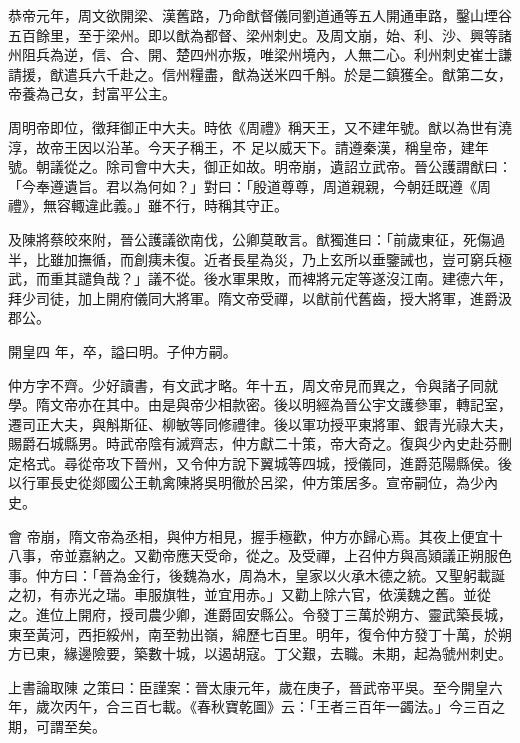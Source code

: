 \begin{pinyinscope}
 恭帝元年，周文欲開梁、漢舊路，乃命猷督儀同劉道通等五人開通車路，鑿山堙谷五百餘里，至于梁州。即以猷為都督、梁州刺史。及周文崩，始、利、沙、興等諸州阻兵為逆，信、合、開、楚四州亦叛，唯梁州境內，人無二心。利州刺史崔士謙請援，猷遣兵六千赴之。信州糧盡，猷為送米四千斛。於是二鎮獲全。猷第二女，帝養為己女，封富平公主。



 周明帝即位，徵拜御正中大夫。時依《周禮》稱天王，又不建年號。猷以為世有澆淳，故帝王因以沿革。今天子稱王，不
 足以威天下。請遵秦漢，稱皇帝，建年號。朝議從之。除司會中大夫，御正如故。明帝崩，遺詔立武帝。晉公護謂猷曰：「今奉遵遺旨。君以為何如？」對曰：「殷道尊尊，周道親親，今朝廷既遵《周禮》，無容輙違此義。」雖不行，時稱其守正。



 及陳將蔡皎來附，晉公護議欲南伐，公卿莫敢言。猷獨進曰：「前歲東征，死傷過半，比雖加撫循，而創痍未復。近者長星為災，乃上玄所以垂鑒誡也，豈可窮兵極武，而重其譴負哉？」議不從。後水軍果敗，而裨將元定等遂沒江南。建德六年，拜少司徒，加上開府儀同大將軍。隋文帝受禪，以猷前代舊齒，授大將軍，進爵汲郡公。



 開皇四
 年，卒，謚曰明。子仲方嗣。



 仲方字不齊。少好讀書，有文武才略。年十五，周文帝見而異之，令與諸子同就學。隋文帝亦在其中。由是與帝少相款密。後以明經為晉公宇文護參軍，轉記室，遷司正大夫，與斛斯征、柳敏等同修禮律。後以軍功授平東將軍、銀青光祿大夫，賜爵石城縣男。時武帝陰有滅齊志，仲方獻二十策，帝大奇之。復與少內史赴芬刪定格式。尋從帝攻下晉州，又令仲方說下翼城等四城，授儀同，進爵范陽縣侯。後以行軍長史從郯國公王軌禽陳將吳明徹於呂梁，仲方策居多。宣帝嗣位，為少內史。



 會
 帝崩，隋文帝為丞相，與仲方相見，握手極歡，仲方亦歸心焉。其夜上便宜十八事，帝並嘉納之。又勸帝應天受命，從之。及受禪，上召仲方與高熲議正朔服色事。仲方曰：「晉為金行，後魏為水，周為木，皇家以火承木德之統。又聖躬載誕之初，有赤光之瑞。車服旗牲，並宜用赤。」又勸上除六官，依漢魏之舊。並從之。進位上開府，授司農少卿，進爵固安縣公。令發丁三萬於朔方、靈武築長城，東至黃河，西拒綏州，南至勃出嶺，綿歷七百里。明年，復令仲方發丁十萬，於朔方已東，緣邊險要，築數十城，以遏胡寇。丁父艱，去職。未期，起為虢州刺史。



 上書論取陳
 之策曰：臣謹案：晉太康元年，歲在庚子，晉武帝平吳。至今開皇六年，歲次丙午，合三百七載。《春秋寶乾圖》云：「王者三百年一蠲法。」今三百之期，可謂至矣。




\end{pinyinscope}
